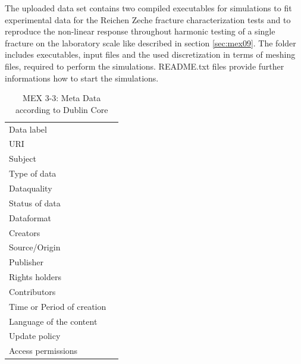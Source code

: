 The uploaded data set contains two compiled executables for simulations to fit experimental data for the Reichen Zeche fracture characterization tests and to reproduce the non-linear response throughout harmonic testing of a single fracture on the laboratory scale like described in section \ref{sec:mex09}. The folder includes executables, input files and the used discretization in terms of meshing files, required to perform the simulations. README.txt files provide further informations how to start the simulations.

\begin{table}[!ht]
\caption{MEX 3-3: Meta Data according to Dublin Core}
\label{tab:dms-mex3-3}
\small
\begin{tabular}{R{3cm}|L{7cm}}
\hline
%
Data label &  \\
URI &  \\
Subject  &  \\
Type of data  &  \\
Dataquality  &  \\
Status of data  &  \\
Dataformat  & \\
Creators  &  \\
Source/Origin &  \\
Publisher  &  \\
Rights holders &  \\
Contributors &  \\
Time or Period of creation &  \\
Language of the content &  \\
Update policy &  \\
Access permissions &  \\
%
\hline
\end{tabular}
\end{table}